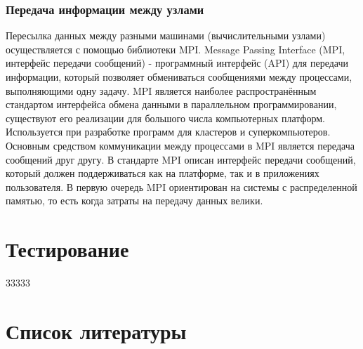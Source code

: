 \documentclass[a4paper, 14pt]{extarticle}
\theoremstyle{definition}
\begin{document}
\subsubsection{Передача информации между узлами}

\par Пересылка данных между разными машинами (вычислительными узлами) осуществляется с помощью библиотеки MPI. Message Passing Interface (MPI, интерфейс передачи сообщений) - программный интерфейс (API) для передачи информации, который позволяет обмениваться сообщениями между процессами, выполняющими одну задачу. MPI является наиболее распространённым стандартом интерфейса обмена данными в параллельном программировании, существуют его реализации для большого числа компьютерных платформ. Используется при разработке программ для кластеров и суперкомпьютеров. Основным средством коммуникации между процессами в MPI является передача сообщений друг другу. В стандарте MPI описан интерфейс передачи сообщений, который должен поддерживаться как на платформе, так и в приложениях пользователя. В первую очередь MPI ориентирован на системы с распределенной памятью, то есть когда затраты на передачу данных велики.

\section{Тестирование}
33333
\section{Список литературы}
\end{document}
